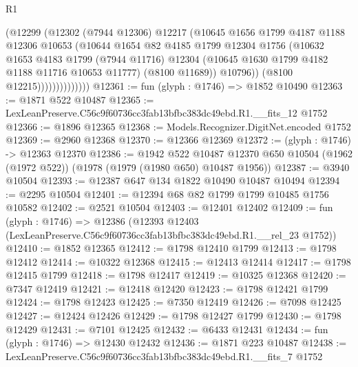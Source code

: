 \begin{lexlean}{R1}
\begin{coremodule}
                          (@12299
                            (@12302
                              (@7944 @12306)
                              @12217
                              (@10645
                                @1656
                                @1799
                                @4187
                                @1188
                                @12306
                                @10653
                                (@10644
                                  @1654
                                  @82
                                  @4185
                                  @1799
                                  @12304
                                  @1756
                                  (@10632
                                    @1653
                                    @4183
                                    @1799
                                    (@7944 @11716)
                                    @12304
                                    (@10645 @1630 @1799 @4182 @1188 @11716 @10653 @11777)
                                    (@8100 @11689))
                                  @10796))
                              (@8100 @12215))))))))))))))
@12361 := fun (glyph : @1746) => @1852 @10490
@12363 := @1871 @522 @10487
@12365 := LexLeanPreserve.C56c9f60736cc3fab13bfbc383dc49ebd.R1.__fits_12 @1752
@12366 := @1896 @12365
@12368 := Models.Recognizer.DigitNet.encoded @1752
@12369 := @2960 @12368
@12370 := @12366 @12369
@12372 := (glyph : @1746) -> @12363 @12370
@12386 := @1942
    @522
    @10487
    @12370
    @650
    @10504
    (@1962 (@1972 @522))
    (@1978 (@1979 (@1980 @650) @10487 @1956))
@12387 := @3940 @10504
@12393 := @12387 @647 @134 @1822 @10490 @10487 @10494
@12394 := @2295 @10504
@12401 := @12394 @68 @82 @1799 @1799 @10485 @1756 @10582
@12402 := @2521 @10504
@12403 := @12401 @12402
@12409 := fun (glyph : @1746) =>
  @12386 (@12393 @12403 (LexLeanPreserve.C56c9f60736cc3fab13bfbc383dc49ebd.R1.__rel_23 @1752))
@12410 := @1852 @12365
@12412 := @1798 @12410 @1799
@12413 := @1798 @12412
@12414 := @10322 @12368
@12415 := @12413 @12414
@12417 := @1798 @12415 @1799
@12418 := @1798 @12417
@12419 := @10325 @12368
@12420 := @7347 @12419
@12421 := @12418 @12420
@12423 := @1798 @12421 @1799
@12424 := @1798 @12423
@12425 := @7350 @12419
@12426 := @7098 @12425
@12427 := @12424 @12426
@12429 := @1798 @12427 @1799
@12430 := @1798 @12429
@12431 := @7101 @12425
@12432 := @6433 @12431
@12434 := fun (glyph : @1746) => @12430 @12432
@12436 := @1871 @223 @10487
@12438 := LexLeanPreserve.C56c9f60736cc3fab13bfbc383dc49ebd.R1.__fits_7 @1752

\end{coremodule}
\end{lexlean}
